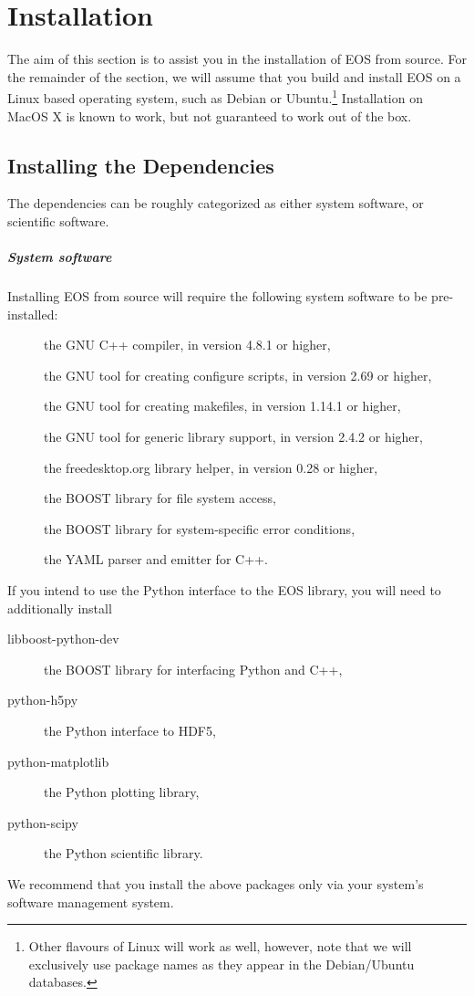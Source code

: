 \chapter{Installation}

The aim of this section is to assist you in the installation of EOS
from source. For the remainder of the section, we will assume that you
build and install EOS on a Linux based operating system, such as Debian
or Ubuntu.\footnote{%
    Other flavours of Linux will work as well, however, note that
    we will exclusively use package names as they appear in the Debian/Ubuntu
     databases.
}
Installation on MacOS X is known to work, but not guaranteed to work out
of the box.

\section{Installing the Dependencies}

The dependencies can be roughly categorized as either system software, or
scientific software.

\paragraph{System software} Installing EOS from source will require the following system
software to be pre-installed:
\begin{description}
    \item[] the GNU C++ compiler, in version 4.8.1 or higher,
    \item[] the GNU tool for creating configure scripts, in version 2.69 or higher,
    \item[] the GNU tool for creating makefiles, in version 1.14.1 or higher,
    \item[] the GNU tool for generic library support, in version 2.4.2 or higher,
    \item[] the freedesktop.org library helper, in version 0.28 or higher,
    \item[] the BOOST library for file system access,
    \item[] the BOOST library for system-specific error conditions,
    \item[] the YAML parser and emitter for C++.
\end{description}
If you intend to use the Python \cite{Python} interface to the EOS library, you will need
to additionally install
\begin{description}
    \item[libboost-python-dev] the BOOST library for interfacing Python and C++,
    \item[python-h5py] the Python interface to HDF5,
    \item[python-matplotlib] the Python plotting library,
    \item[python-scipy] the Python scientific library.
\end{description}
We recommend that you install the above packages only via your system's software management system.

